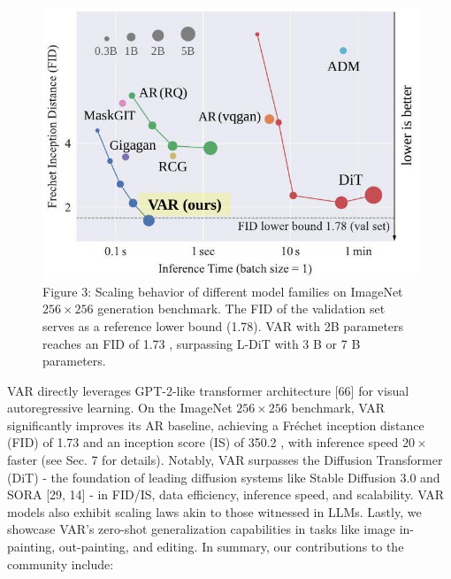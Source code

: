 \documentclass{article}
\begin{document}
\begin{figure}[h]
\begin{center}
  \includegraphics[width=\textwidth]{2025_10_26_62f95e615e8879e267a8g-02}
\captionsetup{labelformat=empty}
\caption{Figure 3: Scaling behavior of different model families on ImageNet $256 \times 256$ generation benchmark. The FID of the validation set serves as a reference lower bound (1.78). VAR with 2B parameters reaches an FID of 1.73 , surpassing L-DiT with 3 B or 7 B parameters.}
\end{center}
\end{figure}

VAR directly leverages GPT-2-like transformer architecture [66] for visual autoregressive learning. On the ImageNet $256 \times 256$ benchmark, VAR significantly improves its AR baseline, achieving a Fréchet inception distance (FID) of 1.73 and an inception score (IS) of 350.2 , with inference speed $20 \times$ faster (see Sec. 7 for details). Notably, VAR surpasses the Diffusion Transformer (DiT) - the foundation of leading diffusion systems like Stable Diffusion 3.0 and SORA [29, 14] - in FID/IS, data efficiency, inference speed, and scalability. VAR models also exhibit scaling laws akin to those witnessed in LLMs. Lastly, we showcase VAR's zero-shot generalization capabilities in tasks like image in-painting, out-painting, and editing. In summary, our contributions to the community include:
\end{document}
